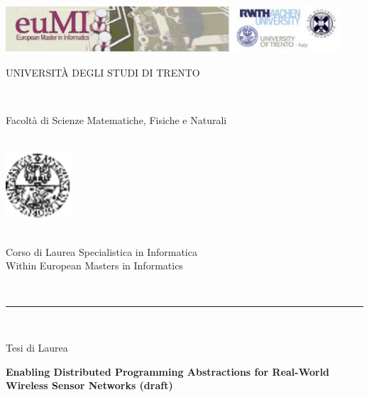 \documentclass[msc, openright, a4paper]{TNthesis}
\author{Galiia Khasanova}
\begin{document}
 


\begin{preliminary}

\begin{titlepage}
	    \begin{center}
	    \vspace{-7.3cm}
	    \includegraphics[scale=.6,width=12.5cm]{img/logo_eumi.eps}\\
	 \vspace{0.3cm}
	        \begin{LARGE}
	        UNIVERSIT\`A DEGLI STUDI DI TRENTO
	        \end{LARGE}\\
	    \begin{large}
	        Facolt\`a di Scienze Matematiche, Fisiche e Naturali\\
	    \end{large}
	        \ \\
	    \vspace{0.5cm}
	    \includegraphics[width=2.5cm]{img/logo_unitn.eps}\\
	    \vspace{-0.3cm}
	    \begin{Large}
	        \ \\
	        Corso di Laurea Specialistica in Informatica\\
	        Within European Masters in Informatics
	        \end{Large}
	        \ \\
	        \hrule
	        \ \\
	        \begin{Large}
	        Tesi di Laurea\\
	        \end{Large}
	        \vspace{1.0cm}
	    \begin{center}
	    \begin{LARGE}
	        \textbf{Enabling Distributed Programming Abstractions for Real-World
Wireless Sensor Networks (draft)}\\
	        \end{LARGE}
	    \end{center}
	

\end{center}
\end{titlepage}
\end{preliminary}
\end{document}
